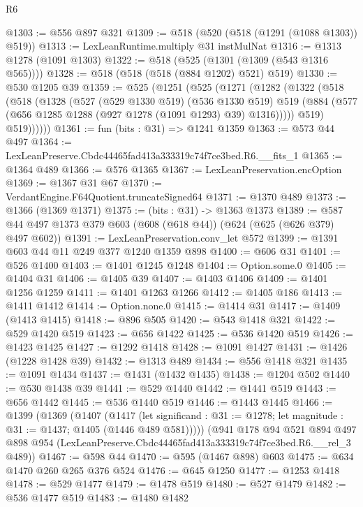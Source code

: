 \begin{lexlean}{R6}
\begin{coremodule}
@1303 := @556 @897 @321
@1309 := @518 (@520 (@518 (@1291 (@1088 @1303)) @519))
@1313 := LexLeanRuntime.multiply @31 instMulNat
@1316 := @1313 @1278 (@1091 @1303)
@1322 := @518 (@525 (@1301 (@1309 (@543 @1316 @565))))
@1328 := @518 (@518 (@518 (@884 @1202) @521) @519)
@1330 := @530 @1205 @39
@1359 := @525
    (@1251
      (@525
        (@1271
          (@1282
            (@1322
              (@518
                (@518
                  (@1328
                    (@527
                      (@529 @1330 @519)
                      (@536 @1330 @519)
                      @519
                      (@884 (@577 (@656 @1285 @1288 (@927 @1278 (@1091 @1293) @39) @1316)))))
                  @519)
                @519))))))
@1361 := fun (bits : @31) => @1241 @1359
@1363 := @573 @44 @497
@1364 := LexLeanPreserve.Cbdc44465fad413a333319c74f7ce3bed.R6.__fits_1
@1365 := @1364 @489
@1366 := @576 @1365
@1367 := LexLeanPreservation.encOption
@1369 := @1367 @31 @67
@1370 := VerdantEngine.F64Quotient.truncateSigned64
@1371 := @1370 @489
@1373 := @1366 (@1369 @1371)
@1375 := (bits : @31) -> @1363 @1373
@1389 := @587 @44 @497 @1373 @379 @603 (@608 (@618 @44)) (@624 (@625 (@626 @379) @497 @602))
@1391 := LexLeanPreservation.conv_let @572
@1399 := @1391 @603 @44 @11 @249 @377 @1240 @1359 @898
@1400 := @606 @31
@1401 := @526 @1400
@1403 := @1401 @1245 @1248
@1404 := Option.some.{0}
@1405 := @1404 @31
@1406 := @1405 @39
@1407 := @1403 @1406
@1409 := @1401 @1256 @1259
@1411 := @1401 @1263 @1266
@1412 := @1405 @186
@1413 := @1411 @1412
@1414 := Option.none.{0}
@1415 := @1414 @31
@1417 := @1409 (@1413 @1415)
@1418 := @896 @505
@1420 := @543 @1418 @321
@1422 := @529 @1420 @519
@1423 := @656 @1422
@1425 := @536 @1420 @519
@1426 := @1423 @1425
@1427 := @1292 @1418
@1428 := @1091 @1427
@1431 := @1426 (@1228 @1428 @39)
@1432 := @1313 @489
@1434 := @556 @1418 @321
@1435 := @1091 @1434
@1437 := @1431 (@1432 @1435)
@1438 := @1204 @502
@1440 := @530 @1438 @39
@1441 := @529 @1440
@1442 := @1441 @519
@1443 := @656 @1442
@1445 := @536 @1440 @519
@1446 := @1443 @1445
@1466 := @1399
    (@1369
      (@1407
        (@1417
          (let significand : @31 := @1278; let magnitude : @31 := @1437; @1405 (@1446 @489 @581)))))
    (@941
      @178
      @94
      @521
      @894
      @497
      @898
      @954
      (LexLeanPreserve.Cbdc44465fad413a333319c74f7ce3bed.R6.__rel_3 @489))
@1467 := @598 @44
@1470 := @595 (@1467 @898) @603
@1475 := @634 @1470 @260 @265 @376 @524
@1476 := @645 @1250
@1477 := @1253 @1418
@1478 := @529 @1477
@1479 := @1478 @519
@1480 := @527 @1479
@1482 := @536 @1477 @519
@1483 := @1480 @1482

\end{coremodule}
\end{lexlean}
